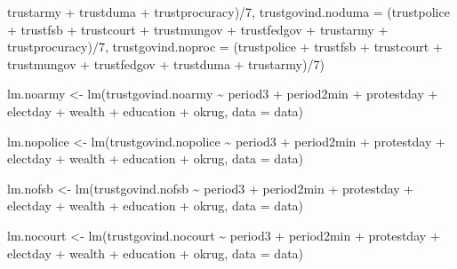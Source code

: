 \documentclass[
  letterpaper,
  DIV=11,
  numbers=noendperiod]{scrartcl}
\newenvironment{Shaded}{\begin{snugshade}}{\end{snugshade}}
\newcommand{\AttributeTok}[1]{\textcolor[rgb]{0.40,0.45,0.13}{#1}}
\newcommand{\DecValTok}[1]{\textcolor[rgb]{0.68,0.00,0.00}{#1}}
\newcommand{\FunctionTok}[1]{\textcolor[rgb]{0.28,0.35,0.67}{#1}}
\newcommand{\NormalTok}[1]{\textcolor[rgb]{0.00,0.23,0.31}{#1}}
\newcommand{\OtherTok}[1]{\textcolor[rgb]{0.00,0.23,0.31}{#1}}
\newcommand{\SpecialCharTok}[1]{\textcolor[rgb]{0.37,0.37,0.37}{#1}}
\begin{document}
\begin{Shaded}
\begin{Highlighting}[]
\NormalTok{                                 trustarmy }\SpecialCharTok{+}\NormalTok{ trustduma }\SpecialCharTok{+}\NormalTok{ trustprocuracy)}\SpecialCharTok{/}\DecValTok{7}\NormalTok{,}
         \AttributeTok{trustgovind.noduma =}\NormalTok{ (trustpolice }\SpecialCharTok{+}\NormalTok{ trustfsb }\SpecialCharTok{+}\NormalTok{ trustcourt }\SpecialCharTok{+}\NormalTok{ trustmungov }\SpecialCharTok{+} 
\NormalTok{                                 trustfedgov }\SpecialCharTok{+}\NormalTok{ trustarmy }\SpecialCharTok{+}\NormalTok{ trustprocuracy)}\SpecialCharTok{/}\DecValTok{7}\NormalTok{,}
         \AttributeTok{trustgovind.noproc =}\NormalTok{ (trustpolice }\SpecialCharTok{+}\NormalTok{ trustfsb }\SpecialCharTok{+}\NormalTok{ trustcourt }\SpecialCharTok{+}\NormalTok{ trustmungov }\SpecialCharTok{+} 
\NormalTok{                                 trustfedgov }\SpecialCharTok{+}\NormalTok{ trustduma }\SpecialCharTok{+}\NormalTok{ trustarmy)}\SpecialCharTok{/}\DecValTok{7}\NormalTok{)}

\NormalTok{lm.noarmy }\OtherTok{\textless{}{-}} \FunctionTok{lm}\NormalTok{(trustgovind.noarmy }\SpecialCharTok{\textasciitilde{}}\NormalTok{ period3 }\SpecialCharTok{+}\NormalTok{ period2min }\SpecialCharTok{+}\NormalTok{ protestday }\SpecialCharTok{+}\NormalTok{ electday }\SpecialCharTok{+}
\NormalTok{                  wealth }\SpecialCharTok{+}\NormalTok{ education }\SpecialCharTok{+}\NormalTok{ okrug, }\AttributeTok{data =}\NormalTok{ data) }

\NormalTok{lm.nopolice }\OtherTok{\textless{}{-}} \FunctionTok{lm}\NormalTok{(trustgovind.nopolice }\SpecialCharTok{\textasciitilde{}}\NormalTok{ period3 }\SpecialCharTok{+}\NormalTok{ period2min }\SpecialCharTok{+}\NormalTok{ protestday }\SpecialCharTok{+}\NormalTok{ electday }\SpecialCharTok{+}
\NormalTok{                  wealth }\SpecialCharTok{+}\NormalTok{ education }\SpecialCharTok{+}\NormalTok{ okrug, }\AttributeTok{data =}\NormalTok{ data) }

\NormalTok{lm.nofsb }\OtherTok{\textless{}{-}} \FunctionTok{lm}\NormalTok{(trustgovind.nofsb }\SpecialCharTok{\textasciitilde{}}\NormalTok{ period3 }\SpecialCharTok{+}\NormalTok{ period2min }\SpecialCharTok{+}\NormalTok{ protestday }\SpecialCharTok{+}\NormalTok{ electday }\SpecialCharTok{+}
\NormalTok{                  wealth }\SpecialCharTok{+}\NormalTok{ education }\SpecialCharTok{+}\NormalTok{ okrug, }\AttributeTok{data =}\NormalTok{ data) }

\NormalTok{lm.nocourt }\OtherTok{\textless{}{-}} \FunctionTok{lm}\NormalTok{(trustgovind.nocourt }\SpecialCharTok{\textasciitilde{}}\NormalTok{ period3 }\SpecialCharTok{+}\NormalTok{ period2min }\SpecialCharTok{+}\NormalTok{ protestday }\SpecialCharTok{+}\NormalTok{ electday }\SpecialCharTok{+}
\NormalTok{                  wealth }\SpecialCharTok{+}\NormalTok{ education }\SpecialCharTok{+}\NormalTok{ okrug, }\AttributeTok{data =}\NormalTok{ data) }


\end{Highlighting}
\end{Shaded}
\end{document}
